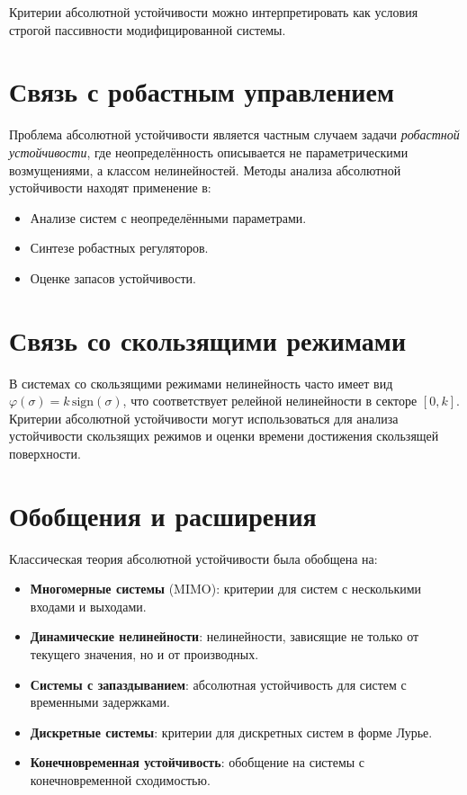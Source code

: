 Критерии абсолютной устойчивости можно интерпретировать как условия строгой пассивности модифицированной системы.

\section{Связь с робастным управлением}

Проблема абсолютной устойчивости является частным случаем задачи \emph{робастной устойчивости}, где неопределённость описывается не параметрическими возмущениями, а классом нелинейностей. Методы анализа абсолютной устойчивости находят применение в:
\begin{itemize}
    \item Анализе систем с неопределёнными параметрами.
    \item Синтезе робастных регуляторов.
    \item Оценке запасов устойчивости.
\end{itemize}

\section{Связь со скользящими режимами}

В системах со скользящими режимами нелинейность часто имеет вид $\varphi(\sigma) = k\,\mathrm{sign}(\sigma)$, что соответствует релейной нелинейности в секторе $[0, k]$. Критерии абсолютной устойчивости могут использоваться для анализа устойчивости скользящих режимов и оценки времени достижения скользящей поверхности.

\section{Обобщения и расширения}

Классическая теория абсолютной устойчивости была обобщена на:
\begin{itemize}
    \item \textbf{Многомерные системы} (MIMO): критерии для систем с несколькими входами и выходами.
    \item \textbf{Динамические нелинейности}: нелинейности, зависящие не только от текущего значения, но и от производных.
    \item \textbf{Системы с запаздыванием}: абсолютная устойчивость для систем с временными задержками.
    \item \textbf{Дискретные системы}: критерии для дискретных систем в форме Лурье.
    \item \textbf{Конечновременная устойчивость}: обобщение на системы с конечновременной сходимостью.
\end{itemize}

